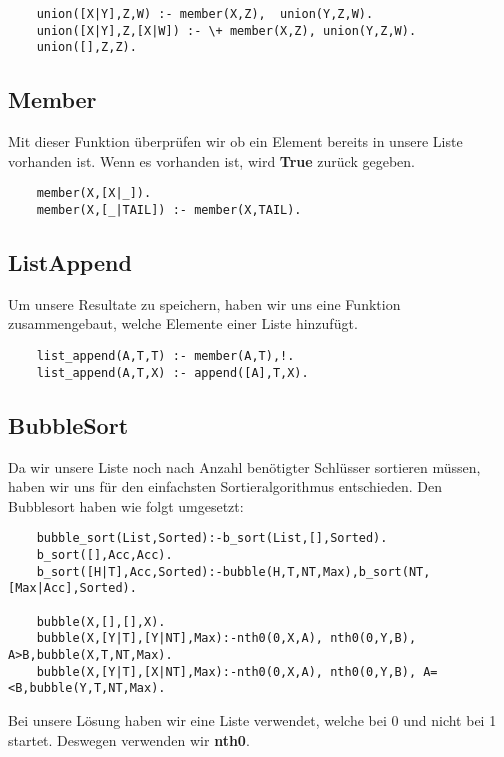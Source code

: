 \begin{verbatim}
    union([X|Y],Z,W) :- member(X,Z),  union(Y,Z,W).
    union([X|Y],Z,[X|W]) :- \+ member(X,Z), union(Y,Z,W).
    union([],Z,Z).
\end{verbatim}

\subsection{Member}
Mit dieser Funktion überprüfen wir ob ein Element bereits in 
unsere Liste vorhanden ist. Wenn es vorhanden ist, wird \textbf{True}
zurück gegeben.

\begin{verbatim}
    member(X,[X|_]).
    member(X,[_|TAIL]) :- member(X,TAIL).
\end{verbatim}

\newpage

\subsection{ListAppend}
Um unsere Resultate zu speichern, haben wir uns eine Funktion
zusammengebaut, welche Elemente einer Liste hinzufügt.

\begin{verbatim}
    list_append(A,T,T) :- member(A,T),!.
    list_append(A,T,X) :- append([A],T,X).
\end{verbatim}

\subsection{BubbleSort}
Da wir unsere Liste noch nach Anzahl benötigter Schlüsser sortieren
müssen, haben wir uns für den einfachsten Sortieralgorithmus 
entschieden. Den Bubblesort haben wie folgt umgesetzt:

\begin{verbatim}
    bubble_sort(List,Sorted):-b_sort(List,[],Sorted).
    b_sort([],Acc,Acc).
    b_sort([H|T],Acc,Sorted):-bubble(H,T,NT,Max),b_sort(NT,[Max|Acc],Sorted).
    
    bubble(X,[],[],X).
    bubble(X,[Y|T],[Y|NT],Max):-nth0(0,X,A), nth0(0,Y,B), A>B,bubble(X,T,NT,Max).
    bubble(X,[Y|T],[X|NT],Max):-nth0(0,X,A), nth0(0,Y,B), A=<B,bubble(Y,T,NT,Max).
\end{verbatim}

\noindent
Bei unsere Lösung haben wir eine Liste verwendet, welche bei 0 und nicht bei 1
startet. Deswegen verwenden wir \textbf{nth0}.

